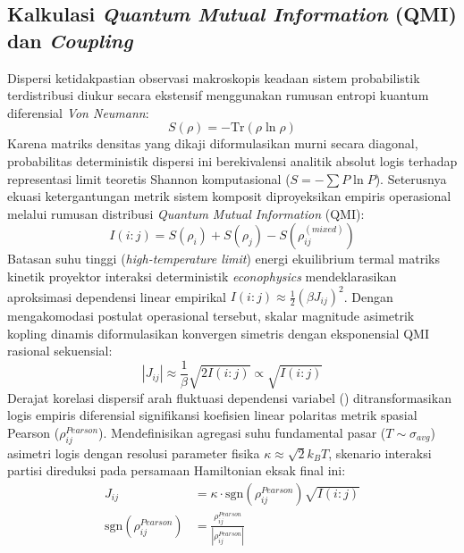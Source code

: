 \subsection{Kalkulasi \emph{Quantum Mutual Information} (QMI) dan \emph{Coupling}}\label{kalkulasi-mutual-information-dan-parameter-interaksi}
Dispersi ketidakpastian observasi makroskopis keadaan sistem probabilistik terdistribusi diukur secara ekstensif menggunakan rumusan entropi kuantum diferensial \emph{Von Neumann}:
\begin{equation}
S(\rho) = -\text{Tr}(\rho \ln \rho)
\end{equation}
Karena matriks densitas yang dikaji diformulasikan murni secara diagonal, probabilitas deterministik dispersi ini berekivalensi analitik absolut logis terhadap representasi limit teoretis Shannon komputasional ($S = -\sum P \ln P$). Seterusnya ekuasi ketergantungan metrik sistem komposit diproyeksikan empiris operasional melalui rumusan distribusi \emph{Quantum Mutual Information} (QMI):
\begin{equation}
I(i:j) = S(\rho_i) + S(\rho_j) - S(\rho_{ij}^{(mixed)})
\end{equation}
Batasan suhu tinggi (\emph{high-temperature limit}) energi ekuilibrium termal matriks kinetik proyektor interaksi deterministik \emph{econophysics} mendeklarasikan aproksimasi dependensi linear empirikal $I(i:j) \approx \frac{1}{2}(\beta J_{ij})^2$. Dengan mengakomodasi postulat operasional tersebut, skalar magnitude asimetrik kopling dinamis diformulasikan konvergen simetris dengan eksponensial QMI rasional sekuensial:
\begin{equation}
|J_{ij}| \approx \frac{1}{\beta}\sqrt{2I(i:j)} \propto \sqrt{I(i:j)} 
\end{equation}
Derajat korelasi dispersif arah fluktuasi dependensi variabel () ditransformasikan logis empiris diferensial signifikansi koefisien linear polaritas metrik spasial Pearson ($\rho_{ij}^{Pearson}$). Mendefinisikan agregasi suhu fundamental pasar ($T \sim \sigma_{avg}$) asimetri logis dengan resolusi parameter fisika $\kappa \approx \sqrt{2}k_BT$, skenario interaksi partisi direduksi pada persamaan Hamiltonian eksak final ini:
\begin{align}
J_{ij} &= \kappa \cdot \text{sgn}(\rho_{ij}^{Pearson}) \sqrt{I(i:j)} \\
\text{sgn}(\rho_{ij}^{Pearson}) &= \frac{\rho_{ij}^{Pearson}}{|\rho_{ij}^{Pearson}|}
\end{align}
